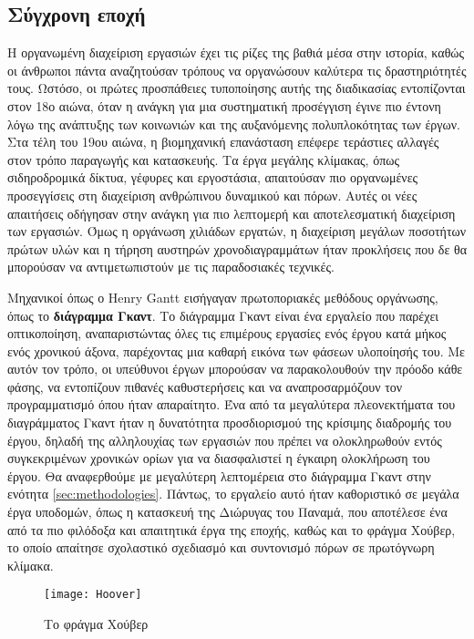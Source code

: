         \subsection{Σύγχρονη εποχή}
            Η οργανωμένη διαχείριση εργασιών έχει τις ρίζες της βαθιά μέσα στην ιστορία, καθώς οι άνθρωποι πάντα αναζητούσαν τρόπους να οργανώσουν καλύτερα τις δραστηριότητές τους. Ωστόσο, οι πρώτες προσπάθειες τυποποίησης αυτής της διαδικασίας εντοπίζονται στον 18ο αιώνα, όταν η ανάγκη για μια συστηματική προσέγγιση έγινε πιο έντονη λόγω της ανάπτυξης των κοινωνιών και της αυξανόμενης πολυπλοκότητας των έργων. Στα τέλη του 19ου αιώνα, η βιομηχανική επανάσταση επέφερε τεράστιες αλλαγές στον τρόπο παραγωγής και κατασκευής. Τα έργα μεγάλης κλίμακας, όπως σιδηροδρομικά δίκτυα, γέφυρες και εργοστάσια, απαιτούσαν πιο οργανωμένες προσεγγίσεις στη διαχείριση ανθρώπινου δυναμικού και πόρων. Αυτές οι νέες απαιτήσεις οδήγησαν στην ανάγκη για πιο λεπτομερή και αποτελεσματική διαχείριση των εργασιών. Όμως η οργάνωση χιλιάδων εργατών, η διαχείριση μεγάλων ποσοτήτων πρώτων υλών και η τήρηση αυστηρών χρονοδιαγραμμάτων ήταν προκλήσεις που δε θα μπορούσαν να αντιμετωπιστούν με τις παραδοσιακές τεχνικές.

            Μηχανικοί όπως ο Henry Gantt εισήγαγαν πρωτοποριακές μεθόδους οργάνωσης, όπως το \textbf{διάγραμμα Γκαντ}. Το διάγραμμα Γκαντ είναι ένα εργαλείο που παρέχει οπτικοποίηση, αναπαριστώντας όλες τις επιμέρους εργασίες ενός έργου κατά μήκος ενός χρονικού άξονα, παρέχοντας μια καθαρή εικόνα των φάσεων υλοποίησής του. Με αυτόν τον τρόπο, οι υπεύθυνοι έργων μπορούσαν να παρακολουθούν την πρόοδο κάθε φάσης, να εντοπίζουν πιθανές καθυστερήσεις και να αναπροσαρμόζουν τον προγραμματισμό όπου ήταν απαραίτητο. Ένα από τα μεγαλύτερα πλεονεκτήματα του διαγράμματος Γκαντ ήταν η δυνατότητα προσδιορισμού της κρίσιμης διαδρομής του έργου, δηλαδή της αλληλουχίας των εργασιών που πρέπει να ολοκληρωθούν εντός συγκεκριμένων χρονικών ορίων για να διασφαλιστεί η έγκαιρη ολοκλήρωση του έργου. Θα αναφερθούμε με μεγαλύτερη λεπτομέρεια στο διάγραμμα Γκαντ στην ενότητα \ref{sec:methodologies}. Πάντως, το εργαλείο αυτό ήταν καθοριστικό σε μεγάλα έργα υποδομών, όπως η κατασκευή της Διώρυγας του Παναμά, που αποτέλεσε ένα από τα πιο φιλόδοξα και απαιτητικά έργα της εποχής, καθώς και το φράγμα Χούβερ, το οποίο απαίτησε σχολαστικό σχεδιασμό και συντονισμό πόρων σε πρωτόγνωρη κλίμακα. \cite{strefapmiHooverGreatest}

            \begin{figure}[h!] \noindent \centering
                \texttt{[image: Hoover]}
                \caption{\centering Το φράγμα Χούβερ \cite{britannicaHoover}}
            \end{figure}

